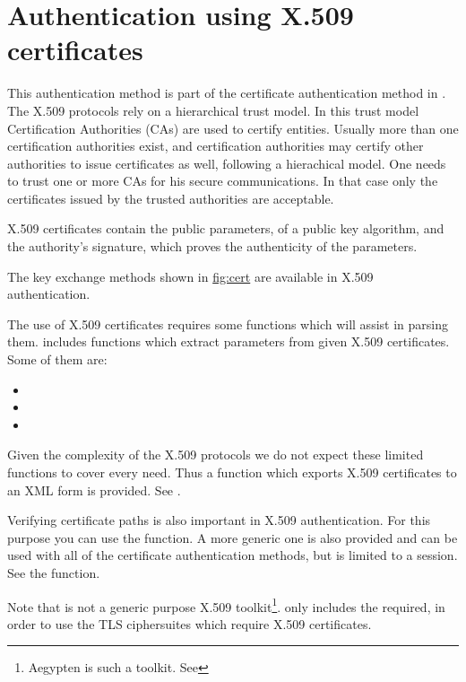 \section{Authentication using X.509 certificates}

This authentication method is part of the certificate authentication
method in \gnutls{}.
The X.509 protocols rely on a hierarchical trust model. In this trust model
Certification Authorities (CAs) are used to certify entities.
Usually more than one certification authorities exist, and certification
authorities may certify other authorities to issue certificates as well,
following a hierachical model. 
One needs to trust one or more CAs for his secure
communications. In that case only the certificates issued by the trusted
authorities are acceptable. 
\par
X.509 certificates contain the public parameters, 
of a public key algorithm, and the authority's signature, which proves the
authenticity of the parameters.
\par
The key exchange methods shown in \hyperref{figure}{figure }{}{fig:cert} are
available in X.509 authentication. 

\par The use of X.509 certificates requires some functions which will 
assist in parsing them. \gnutls{} includes functions which extract 
parameters from given X.509 certificates. Some of them are:
\begin{itemize}
\item {}
\item {}
\item {}
\end{itemize}

Given the complexity of the X.509 protocols we do not expect these limited 
functions to cover every need. Thus a function which exports X.509 certificates
to an XML form is provided. See 
.

\par
Verifying certificate paths is also important in X.509 authentication.
For this purpose you can use the
function. A more generic one is also provided and can be used with all
of the certificate authentication methods, but is limited to a session. See the
function.

\par
Note that \gnutls{} is not a generic purpose X.509 toolkit\footnote{Aegypten is such a toolkit. See 
}. 
\gnutls{} only includes the required,
in order to use the TLS ciphersuites which require X.509 certificates.

